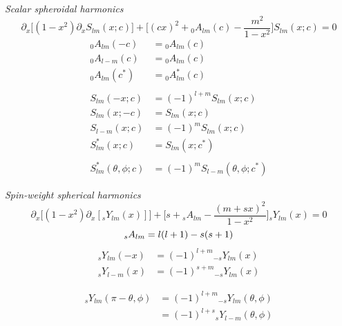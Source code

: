 \documentclass[11pt]{article}
\begin{document}
\noindent
{\it Scalar spheroidal harmonics}\\
\begin{equation}
\partial_x \Big[ (1-x^2)\partial_x S_{lm}(x;c)\Big] + \bigg[(cx)^2 + {}_0A_{lm}(c) - \frac{m^2}{1-x^2}\bigg]S_{lm}(x;c) = 0
\end{equation}
\begin{align}
{}_0A_{lm}(-c) &= {}_0A_{lm}(c) \\
{}_0A_{l-m}(c) &= {}_0A_{lm}(c) \\
{}_0A_{lm}(c^*) &= {}_0A^*_{lm}(c) \\\nonumber\\
S_{lm}(-x;c) &= (-1)^{l+m} S_{lm}(x;c) \\
S_{lm}(x;-c) &= S_{lm}(x;c) \\
S_{l-m}(x;c) &= (-1)^m S_{lm}(x;c) \\
S^*_{lm}(x;c) &= S_{lm}(x;c^*) \\\nonumber \\
S^*_{lm}(\theta, \phi;c) &= (-1)^m S_{l-m}(\theta, \phi; c^*)
\end{align}

\noindent
{\it Spin-weight spherical harmonics} \\
\begin{equation}
\partial_x \Big[ (1-x^2)\partial_x [{}_sY_{lm}(x)]\Big] + \bigg[s + {}_sA_{lm} - \frac{(m+sx)^2}{1-x^2}\bigg]{}_sY_{lm}(x) = 0
\end{equation}
\begin{equation}
{}_sA_{lm} = l(l+1) - s(s+1)\\
\end{equation}
\begin{align}
{}_{s}Y_{lm}(-x) &= (-1)^{l+m} {}_{-s}Y_{lm}(x) \\
{}_{s}Y_{l-m}(x) &= (-1)^{s+m} {}_{-s}Y_{lm}(x)
\end{align}

\begin{align} \label{sYlm:eq1}
{}_{s}Y_{lm}(\pi-\theta,\phi) &= (-1)^{l+m} {}_{-s}Y_{lm}(\theta, \phi) \\
\nonumber					  &= (-1)^{l+s} {}_{s}Y_{l-m}(\theta, \phi)
\end{align}
\end{document}
